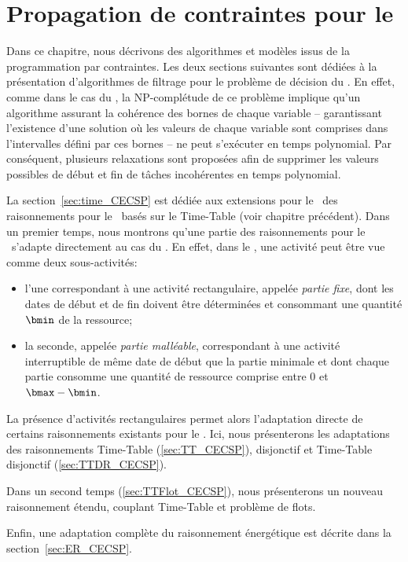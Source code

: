 \chapter{Propagation de contraintes pour le 
\CECSP}
\label{sec:PPC_CECSP}
Dans ce chapitre, nous décrivons des algorithmes et modèles issus de
la programmation par contraintes. Les deux sections suivantes sont
dédiées à la présentation d'algorithmes de filtrage pour le problème
de décision du \CECSP. En effet, comme dans le cas du \CUSP, la
NP-complétude de ce problème implique qu'un algorithme assurant la
cohérence des bornes de chaque variable -- garantissant l'existence
d'une solution où les valeurs de chaque variable sont comprises dans
l'intervalles défini par ces bornes -- ne peut s'exécuter en temps
polynomial. Par conséquent, plusieurs relaxations sont proposées afin
de supprimer les valeurs possibles de début et fin de tâches
incohérentes en temps polynomial.

La section~\ref{sec:time_CECSP} est dédiée aux extensions pour le
\CECSP~des raisonnements pour le \CUSP~basés sur le Time-Table (voir
chapitre précédent). Dans un premier temps, nous montrons qu'une
partie des raisonnements pour le \CUSP~s'adapte directement au cas du
\CECSP. En effet, dans le \CECSP, une activité peut être vue comme
deux sous-activités:
\begin{itemize}
\item l'une correspondant à une activité rectangulaire, appelée {\it
partie fixe}, dont les dates de début et de fin doivent être
déterminées et consommant une quantité $\bmin$ de la ressource;
\item la seconde, appelée {\it partie malléable}, correspondant à une
activité interruptible de même date de début que la partie minimale et
dont chaque partie consomme une quantité de ressource comprise entre
$0$ et $\bmax-\bmin$.
\end{itemize}
La présence d'activités rectangulaires permet alors l'adaptation directe
de certains raisonnements existants pour le \CUSP. Ici, nous
présenterons les adaptations des raisonnements Time-Table
(\ref{sec:TT_CECSP}), disjonctif et Time-Table disjonctif
(\ref{sec:TTDR_CECSP}).  

Dans un second temps (\ref{sec:TTFlot_CECSP}), nous présenterons un nouveau
raisonnement étendu, couplant Time-Table et problème de flots. 

Enfin, une adaptation complète du raisonnement énergétique est décrite 
dans la section~\ref{sec:ER_CECSP}.






